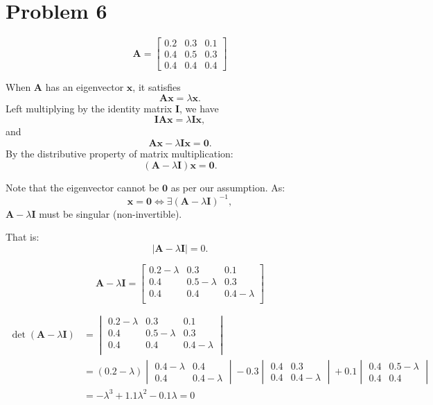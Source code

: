 \documentclass[12pt,a4paper]{article}
\begin{document}
\section*{Problem 6}
$$\mathbf{A} = 
\begin{bmatrix}
0.2 & 0.3 & 0.1 \\
0.4 & 0.5 & 0.3 \\
0.4 & 0.4 & 0.4
\end{bmatrix}
$$

When \(\mathbf{A}\) has an eigenvector \(\mathbf{x}\), it satisfies
$$\mathbf{A}\mathbf{x} = \lambda \mathbf{x}.$$
Left multiplying by the identity matrix \(\mathbf{I}\), we have
\[
\mathbf{I}\mathbf{A}\mathbf{x} = \lambda \mathbf{I}\mathbf{x},
\]
and
\[
\mathbf{A}\mathbf{x} - \lambda \mathbf{I}\mathbf{x} = \mathbf{0}.
\]
By the distributive property of matrix multiplication:
\[
(\mathbf{A} - \lambda \mathbf{I})\mathbf{x} = \mathbf{0}.
\]

Note that the eigenvector cannot be \(\mathbf{0}\) as per our assumption. As:
\[
\mathbf{x} = \mathbf{0} \iff \exists (\mathbf{A} - \lambda \mathbf{I})^{-1},
\]
\(\mathbf{A} - \lambda \mathbf{I}\) must be singular (non-invertible).

That is:
\[
|\mathbf{A} - \lambda \mathbf{I}| = 0.
\]

\[
\mathbf{A} - \lambda \mathbf{I} = 
\begin{bmatrix}
 0.2 - \lambda & 0.3 & 0.1 \\
 0.4 & 0.5 - \lambda & 0.3 \\
 0.4 & 0.4 & 0.4 - \lambda \\
\end{bmatrix}
\]

$$\begin{aligned}
\det(\mathbf{A} - \lambda \mathbf{I}) &= 
\begin{vmatrix}
 0.2 - \lambda & 0.3 & 0.1 \\
 0.4 & 0.5 - \lambda & 0.3 \\
 0.4 & 0.4 & 0.4 - \lambda \\
\end{vmatrix}\\
&= (0.2 - \lambda)\begin{vmatrix}
    0.4 - \lambda & 0.4 \\
    0.4 & 0.4 - \lambda
\end{vmatrix}
-0.3 \begin{vmatrix}
    0.4 & 0.3 \\
    0.4 & 0.4 - \lambda
\end{vmatrix}
+ 0.1 \begin{vmatrix}
    0.4 & 0.5 - \lambda \\
    0.4 & 0.4
\end{vmatrix}\\
&= -\lambda^3 + 1.1\lambda^2 - 0.1\lambda = 0
\end{aligned}$$
\end{document}
